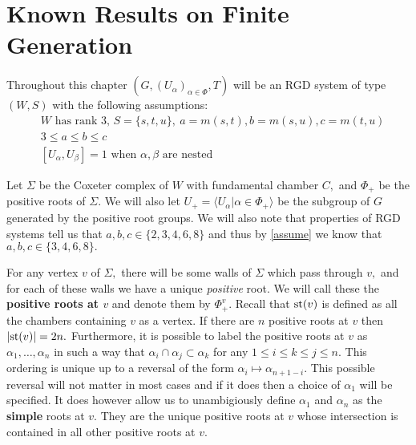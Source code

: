 \documentclass[class=book, crop=false,12 pt]{standalone}
\begin{document}
\chapter{Known Results on Finite Generation}
\label{ch:known}

Throughout this chapter $(G,(U_\alpha)_{\alpha\in \Phi},T)$ will be an RGD system of type $(W,S)$ with the following assumptions:
\smallskip
\begin{equation}
\begin{aligned}
	&W \text{ has rank 3, }S=\{s,t,u\},\: a=m(s,t),b=m(s,u),c=m(t,u)\\
	&3\le a\le b\le c\\
	&[U_\alpha,U_\beta]=1\text{ when }\alpha,\beta \text{ are nested}
\end{aligned}
\end{equation}
\smallskip

Let $\Sigma$ be the Coxeter complex of $W$ with fundamental chamber $C,$ and $\Phi_+$ be the positive roots of $\Sigma.$ We will also let $U_+=\langle U_\alpha|\alpha\in \Phi_+\rangle$ be the subgroup of $G$ generated by the positive root groups. We will also note that properties of RGD systems tell us that $a,b,c\in \{2,3,4,6,8\}$ and thus by \eqref{assume} we know that $a,b,c\in \{3,4,6,8\}.$


For any vertex $v$ of $\Sigma,$ there will be some walls of $\Sigma$ which pass through $v,$ and for each of these walls we have a unique \emph{positive} root. We will call these the \textbf{positive roots at $v$} and denote them by $\Phi_+^v.$ Recall that $\mathrm{st}(v)$ is defined as all the chambers containing $v$ as a vertex. If there are $n$ positive roots at $v$ then $|\mathrm{st}(v)|=2n.$ Furthermore, it is possible to label the positive roots at $v$ as $\alpha_1,\dots,\alpha_n$ in such a way that $\alpha_i\cap \alpha_j\subset \alpha_k$ for any $1\le i\le k\le j\le n.$ This ordering is unique up to a reversal of the form $\alpha_i\mapsto \alpha_{n+1-i}.$ This possible reversal will not matter in most cases and if it does then a choice of $\alpha_1$ will be specified. It does however allow us to unambigiously define $\alpha_1$ and $\alpha_n$ as the \textbf{simple} roots at $v.$ They are the unique positive roots at $v$ whose intersection is contained in all other positive roots at $v.$
\end{document}
